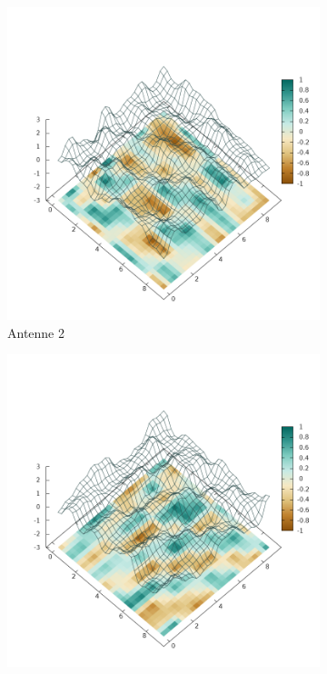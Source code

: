 \begin{figure}[ht!]
\begin{subfigure}[b]{0.4\textwidth}
            \includegraphics[width=\textwidth]{img/Plate0_A2.png}
          	\caption[Loren ipsum]{Antenne 2}
         	\label{fig:Plate0_A2}
        \end{subfigure}
\qquad\qquad
        \begin{subfigure}[b]{0.4\textwidth}
			\centering
			\includegraphics[width=\textwidth]{img/Plate0_A4.png}

\end{subfigure}
\end{figure}
